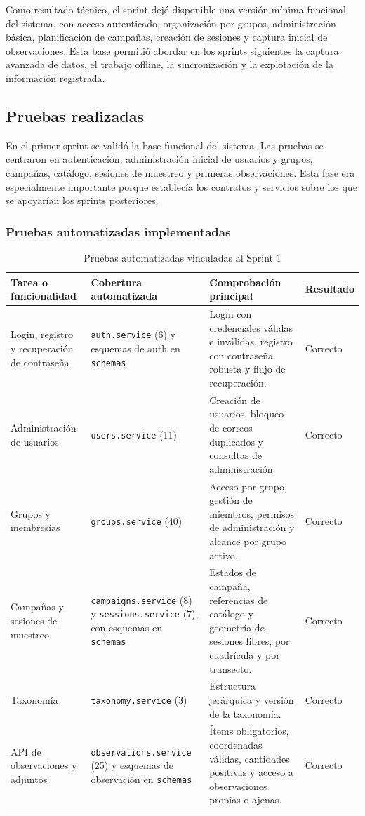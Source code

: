 Como resultado técnico, el sprint dejó disponible una versión mínima funcional
del sistema, con acceso autenticado, organización por grupos, administración
básica, planificación de campañas, creación de sesiones y captura inicial de
observaciones. Esta base permitió abordar en los sprints siguientes la captura
avanzada de datos, el trabajo offline, la sincronización y la explotación de la
información registrada.
\subsection{Pruebas realizadas}

En el primer sprint se validó la base funcional del sistema. Las pruebas se centraron en autenticación, administración inicial de usuarios y grupos, campañas, catálogo, sesiones de muestreo y primeras observaciones. Esta fase era especialmente importante porque establecía los contratos y servicios sobre los que se apoyarían los sprints posteriores.

\subsubsection{Pruebas automatizadas implementadas}

\begin{table}[H]
\centering
\caption{Pruebas automatizadas vinculadas al Sprint 1}
\label{tab:pruebas_automatizadas_sprint1}
\scriptsize
\begin{tabularx}{\textwidth}{p{3.5cm}p{3cm}X p{1.8cm}}
\toprule
Tarea o funcionalidad & Cobertura automatizada & Comprobación principal & Resultado \\
\midrule
Login, registro y recuperación de contraseña & \texttt{auth.service} (6) y esquemas de auth en \texttt{schemas} & Login con credenciales válidas e inválidas, registro con contraseña robusta y flujo de recuperación. & Correcto \\
Administración de usuarios & \texttt{users.service} (11) & Creación de usuarios, bloqueo de correos duplicados y consultas de administración. & Correcto \\
Grupos y membresías & \texttt{groups.service} (40) & Acceso por grupo, gestión de miembros, permisos de administración y alcance por grupo activo. & Correcto \\
Campañas y sesiones de muestreo & \texttt{campaigns.service} (8) y \texttt{sessions.service} (7), con esquemas en \texttt{schemas} & Estados de campaña, referencias de catálogo y geometría de sesiones libres, por cuadrícula y por transecto. & Correcto \\
Taxonomía & \texttt{taxonomy.service} (3) & Estructura jerárquica y versión de la taxonomía. & Correcto \\
API de observaciones y adjuntos & \texttt{observations.service} (25) y esquemas de observación en \texttt{schemas} & Ítems obligatorios, coordenadas válidas, cantidades positivas y acceso a observaciones propias o ajenas. & Correcto \\
\bottomrule
\end{tabularx}
\end{table}

